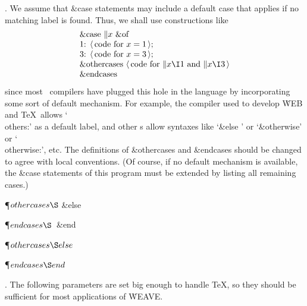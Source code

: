 \*. We assume that   \&{case}  statements may include a default case that
applies
if no matching label is found. Thus, we shall use constructions like
$$\vbox{\halign{#\hfil\cr
 \&{case} $\|x$ \&{of}\cr
1: $\langle\,$code for $x=1\,\rangle$;\cr
3: $\langle\,$code for $x=3\,\rangle$;\cr
 \&{othercases}  $\langle\,$code for $\|x\I1$ and $\|x\I3$$\,\rangle$\cr
  \&{endcases} \cr}}$$
since most \PASCAL\ compilers have plugged this hole in the language by
incorporating some sort of default mechanism. For example, the compiler
used to develop \.{WEB} and \TeX\ allows `\\{others}:' as a default label,
and other \PASCAL s allow syntaxes like `\ignorespaces \&{else} \unskip' or
`\&{otherwise}' or `\\{otherwise}:', etc. The definitions of  \&{othercases}
and   \&{endcases}  should be changed to agree with local conventions.
(Of course, if no default mechanism is available, the   \&{case}  statements of
this program must be extended by listing all remaining cases.)

\Y\P\D {}$\\{othercases}\S$\6
\4\&{else} \par
\P\D {}$\\{endcases}\S$\ \&{end} \par
\P\F {}$\\{othercases}\S\\{else}$\par
\P\F {}$\\{endcases}\S\\{end}$\par
\fi

. The following parameters are set big enough to handle \TeX, so they
should be sufficient for most applications of \.{WEAVE}.

